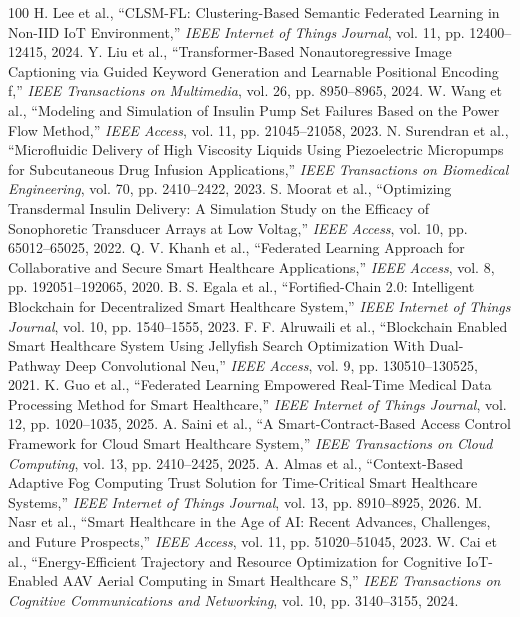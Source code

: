 \documentclass[journal]{IEEEtran}
\begin{document}
\begin{thebibliography}{100}
 H. Lee et al., ``CLSM-FL: Clustering-Based Semantic Federated Learning in Non-IID IoT Environment,'' \emph{IEEE Internet of Things Journal}, vol. 11, pp. 12400--12415, 2024.
 Y. Liu et al., ``Transformer-Based Nonautoregressive Image Captioning via Guided Keyword Generation and Learnable Positional Encoding f,'' \emph{IEEE Transactions on Multimedia}, vol. 26, pp. 8950--8965, 2024.
 W. Wang et al., ``Modeling and Simulation of Insulin Pump Set Failures Based on the Power Flow Method,'' \emph{IEEE Access}, vol. 11, pp. 21045--21058, 2023.
 N. Surendran et al., ``Microfluidic Delivery of High Viscosity Liquids Using Piezoelectric Micropumps for Subcutaneous Drug Infusion Applications,'' \emph{IEEE Transactions on Biomedical Engineering}, vol. 70, pp. 2410--2422, 2023.
 S. Moorat et al., ``Optimizing Transdermal Insulin Delivery: A Simulation Study on the Efficacy of Sonophoretic Transducer Arrays at Low Voltag,'' \emph{IEEE Access}, vol. 10, pp. 65012--65025, 2022.
 Q. V. Khanh et al., ``Federated Learning Approach for Collaborative and Secure Smart Healthcare Applications,'' \emph{IEEE Access}, vol. 8, pp. 192051--192065, 2020.
 B. S. Egala et al., ``Fortified-Chain 2.0: Intelligent Blockchain for Decentralized Smart Healthcare System,'' \emph{IEEE Internet of Things Journal}, vol. 10, pp. 1540--1555, 2023.
 F. F. Alruwaili et al., ``Blockchain Enabled Smart Healthcare System Using Jellyfish Search Optimization With Dual-Pathway Deep Convolutional Neu,'' \emph{IEEE Access}, vol. 9, pp. 130510--130525, 2021.
 K. Guo et al., ``Federated Learning Empowered Real-Time Medical Data Processing Method for Smart Healthcare,'' \emph{IEEE Internet of Things Journal}, vol. 12, pp. 1020--1035, 2025.
 A. Saini et al., ``A Smart-Contract-Based Access Control Framework for Cloud Smart Healthcare System,'' \emph{IEEE Transactions on Cloud Computing}, vol. 13, pp. 2410--2425, 2025.
 A. Almas et al., ``Context-Based Adaptive Fog Computing Trust Solution for Time-Critical Smart Healthcare Systems,'' \emph{IEEE Internet of Things Journal}, vol. 13, pp. 8910--8925, 2026.
 M. Nasr et al., ``Smart Healthcare in the Age of AI: Recent Advances, Challenges, and Future Prospects,'' \emph{IEEE Access}, vol. 11, pp. 51020--51045, 2023.
 W. Cai et al., ``Energy-Efficient Trajectory and Resource Optimization for Cognitive IoT-Enabled AAV Aerial Computing in Smart Healthcare S,'' \emph{IEEE Transactions on Cognitive Communications and Networking}, vol. 10, pp. 3140--3155, 2024.

\end{thebibliography}
\end{document}

